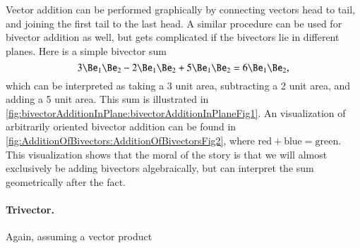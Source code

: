 Vector addition can be performed graphically by connecting vectors head to tail, and joining the first tail to the last head.  A similar procedure can be used for bivector addition as well, but gets complicated if the bivectors lie in different planes.  Here is a simple bivector sum
\begin{dmath}\label{eqn:multivector:160}
3 \Be_1 \Be_2 - 2 \Be_1 \Be_2 + 5 \Be_1 \Be_2 = 6 \Be_1 \Be_2,
\end{dmath}
which can be interpreted as taking a 3 unit area, subtracting a 2 unit area, and adding a 5 unit area.  This sum is illustrated in
\cref{fig:bivectorAdditionInPlane:bivectorAdditionInPlaneFig1}.
An visualization of arbitrarily oriented bivector addition can be found in
\cref{fig:AdditionOfBivectors:AdditionOfBivectorsFig2}, where \( \text{red} + \text{blue} = \text{green} \).  This visualization shows that the
moral of the story is that we will almost exclusively be adding bivectors algebraically, but can interpret the sum geometrically after the fact.

\paragraph{Trivector.}

Again, assuming a vector product


